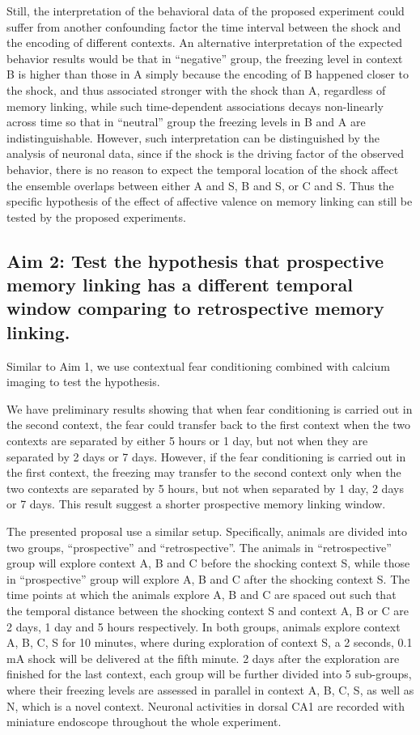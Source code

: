\documentclass[master.tex]{subfiles}
\begin{document}
Still, the interpretation of the behavioral data of the proposed experiment
could suffer from another confounding factor \textemdash{} the time interval
between the shock and the encoding of different contexts. An alternative
interpretation of the expected behavior results would be that in ``negative''
group, the freezing level in context B is higher than those in A simply because
the encoding of B happened closer to the shock, and thus associated stronger
with the shock than A, regardless of memory linking, while such time-dependent
associations decays non-linearly across time so that in ``neutral'' group the
freezing levels in B and A are indistinguishable. However, such interpretation
can be distinguished by the analysis of neuronal data, since if the shock is the
driving factor of the observed behavior, there is no reason to expect the
temporal location of the shock affect the ensemble overlaps between either A and
S, B and S, or C and S. Thus the specific hypothesis of the effect of affective
valence on memory linking can still be tested by the proposed experiments.

\subsection*{Aim 2: Test the hypothesis that prospective memory linking has a
  different temporal window comparing to retrospective memory linking.}

Similar to Aim 1, we use contextual fear conditioning combined with calcium
imaging to test the hypothesis.

We have preliminary results showing that when fear conditioning is carried out
in the second context, the fear could transfer back to the first context when
the two contexts are separated by either 5 hours or 1 day, but not when they are
separated by 2 days or 7 days. However, if the fear conditioning is carried out
in the first context, the freezing may transfer to the second context only when
the two contexts are separated by 5 hours, but not when separated by 1 day, 2
days or 7 days. This result suggest a shorter prospective memory linking window.

The presented proposal use a similar setup. Specifically, animals are divided
into two groups, ``prospective'' and ``retrospective''. The animals in
``retrospective'' group will explore context A, B and C before the shocking
context S, while those in ``prospective'' group will explore A, B and C after
the shocking context S. The time points at which the animals explore A, B and C
are spaced out such that the temporal distance between the shocking context S
and context A, B or C are 2 days, 1 day and 5 hours respectively. In both
groups, animals explore context A, B, C, S for 10 minutes, where during
exploration of context S, a 2 seconds, 0.1 mA shock will be delivered at the
fifth minute. 2 days after the exploration are finished for the last context,
each group will be further divided into 5 sub-groups, where their freezing
levels are assessed in parallel in context A, B, C, S, as well as N, which is a
novel context. Neuronal activities in dorsal CA1 are recorded with miniature
endoscope throughout the whole experiment.
\end{document}
